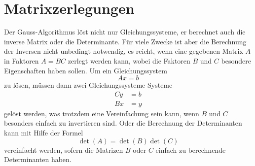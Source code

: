 %
%
%
\chapter{Matrixzerlegungen\label{chapter-zerlegung}}
\rhead{}
Der Gauss-Algorithmus löst nicht nur Gleichungssysteme, er berechnet
auch die inverse Matrix oder die Determinante.
Für viele Zwecke ist
aber die Berechnung der Inversen nicht unbedingt notwendig, es reicht,
wenn eine gegebenen Matrix $A$ in Faktoren $A=BC$ zerlegt werden kann,
wobei die Faktoren $B$ und $C$ besondere Eigenschaften haben sollen.
Um ein Gleichungssystem
\[
Ax=b
\]
zu lösen, müssen dann zwei Gleichungssysteme Systeme
\begin{align*}
Cy&=b\\
Bx&=y
\end{align*}
gelöst werden, was trotzdem eine Vereinfachung sein kann, wenn
$B$ und $C$ besonders einfach zu invertieren sind.
Oder die Berechnung der Determinanten kann mit Hilfe der Formel
\[
\det(A)=\det(B)\det(C)
\]
vereinfacht werden, sofern die Matrizen $B$ oder $C$ einfach
zu berechnende Determinanten haben.







